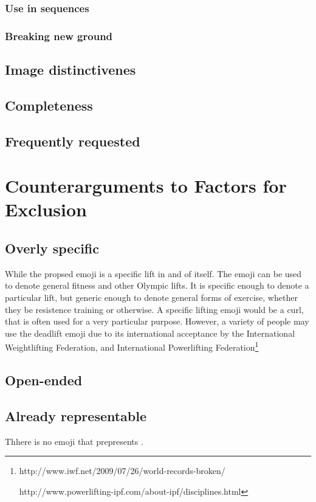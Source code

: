 \documentclass{article}
\begin{document}
\subsubsection{Use in sequences}
\subsubsection{Breaking new ground}

\subsection{Image distinctivenes}
\subsection{Completeness}
\subsection{Frequently requested}

\section{Counterarguments to Factors for Exclusion}
\subsection{Overly specific}
While the propsed emoji \emojiname{} is a specific lift in and of itself. The emoji can be used to denote general fitness and other Olympic lifts. It is specific enough to denote 
a particular lift, but generic enough to denote general forms of exercise, whether they be resistence training or otherwise. A specific lifting emoji would be a curl, that is often
used for a very particular purpose. However, a variety of people may use the deadlift emoji due to its international acceptance by the International Weightlifting Federation, and International Powerlifting Federation\footnote{http://www.iwf.net/2009/07/26/world-records-broken/

http://www.powerlifting-ipf.com/about-ipf/disciplines.html
}

\subsection{Open-ended}
\subsection{Already representable}
Thhere is no emoji that prepresents \emojiname{}.
\end{document}
